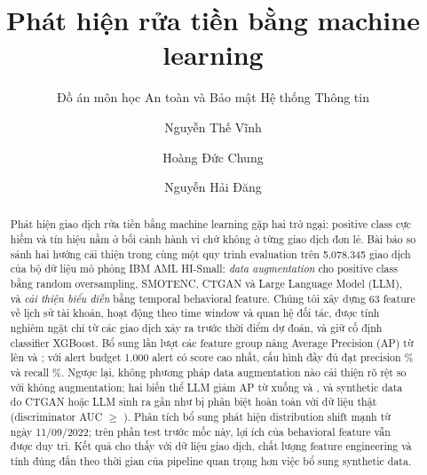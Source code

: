 \documentclass[sigconf,nonacm]{acmart}
\begin{document}
\title{Phát hiện rửa tiền bằng machine learning}
\subtitle{Đồ án môn học An toàn và Bảo mật Hệ thống Thông tin}

\author{Nguyễn Thế Vĩnh}

\author{Hoàng Đức Chung}

\author{Nguyễn Hải Đăng}

\renewcommand{\shortauthors}{Nguyễn Thế Vĩnh, Hoàng Đức Chung và Nguyễn Hải Đăng}

\begin{abstract}
Phát hiện giao dịch rửa tiền bằng machine learning gặp hai trở ngại: positive class cực hiếm và tín hiệu nằm ở
bối cảnh hành vi chứ không ở từng giao dịch đơn lẻ. Bài báo so sánh hai hướng cải thiện trong cùng một quy trình
evaluation trên 5.078.345 giao dịch của bộ dữ liệu mô phỏng IBM AML HI-Small: \emph{data augmentation} cho positive
class bằng random oversampling, SMOTENC, CTGAN và Large Language Model (LLM), và \emph{cải thiện biểu diễn} bằng
temporal behavioral feature. Chúng tôi xây dựng 63 feature về lịch sử tài khoản, hoạt động theo time window và quan
hệ đối tác, được tính nghiêm ngặt chỉ từ các giao dịch xảy ra trước thời điểm dự đoán, và giữ cố định classifier
XGBoost. Bổ sung lần lượt các feature group nâng Average Precision (AP) từ \FZeroAP{} lên \FOneAP{} và \FFourAP;
với alert budget 1.000 alert có score cao nhất, cấu hình đầy đủ đạt precision \FFourPkPct\% và recall
\FFourRkPct\%. Ngược lại, không phương pháp data augmentation nào cải thiện rõ rệt so với không augmentation; hai
biến thể LLM giảm AP từ \EZeroAP{} xuống \ELLMaAP{} và \ELLMbAP, và synthetic data do CTGAN hoặc LLM sinh ra gần
như bị phân biệt hoàn toàn với dữ liệu thật (discriminator AUC $\geq$ \ELLMaDisc). Phân tích bổ sung phát hiện
distribution shift mạnh từ ngày 11/09/2022; trên phần test trước mốc này, lợi ích của behavioral feature vẫn được
duy trì. Kết quả cho thấy với dữ liệu giao dịch, chất lượng feature engineering và tính đúng đắn theo thời gian
của pipeline quan trọng hơn việc bổ sung synthetic data.
\end{abstract}
\end{document}
